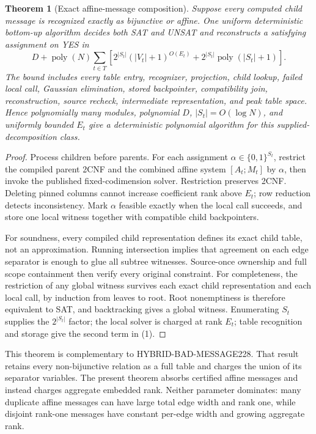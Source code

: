 \documentclass[11pt]{article}
\newtheorem{theorem}{Theorem}
\begin{document}
\begin{theorem}[Exact affine-message composition]
Suppose every computed child message is recognized exactly as bijunctive or
affine.  One uniform deterministic bottom-up algorithm decides both SAT and
UNSAT and reconstructs a satisfying assignment on YES in
\[
 D+\operatorname{poly}(N)\sum_{t\in T}
 \left[2^{|S_t|}(|V_t|+1)^{O(E_t)}
       +2^{|S_t|}\operatorname{poly}(|S_t|+1)\right]. \tag{1}
\]
The bound includes every table entry, recognizer, projection, child lookup,
failed local call, Gaussian elimination, stored backpointer, compatibility
join, reconstruction, source recheck, intermediate representation, and peak
table space.  Hence polynomially many modules, polynomial $D$,
$|S_t|=O(\log N)$, and uniformly bounded $E_t$ give a deterministic
polynomial algorithm for this supplied-decomposition class.
\end{theorem}
\begin{proof}
Process children before parents.  For each assignment
$\alpha\in\{0,1\}^{S_t}$, restrict the compiled parent 2CNF and the combined
affine system $[A_t;M_t]$ by $\alpha$, then invoke the published
fixed-codimension solver.  Restriction preserves 2CNF.  Deleting pinned
columns cannot increase coefficient rank above $E_t$; row reduction detects
inconsistency.  Mark $\alpha$ feasible exactly when the local call succeeds,
and store one local witness together with compatible child backpointers.

For soundness, every compiled child representation defines its exact child
table, not an approximation.  Running intersection implies that agreement on
each edge separator is enough to glue all subtree witnesses.  Source-once
ownership and full scope containment then verify every original constraint.
For completeness, the restriction of any global witness survives each exact
child representation and each local call, by induction from leaves to root.
Root nonemptiness is therefore equivalent to SAT, and backtracking gives a
global witness.  Enumerating $S_t$ supplies the $2^{|S_t|}$ factor; the local
solver is charged at rank $E_t$; table recognition and storage give the
second term in (1).
\end{proof}

This theorem is complementary to HYBRID-BAD-MESSAGE228.  That result retains
every non-bijunctive relation as a full table and charges the union of its
separator variables.  The present theorem absorbs certified affine messages
and instead charges aggregate embedded rank.  Neither parameter dominates:
many duplicate affine messages can have large total edge width and rank one,
while disjoint rank-one messages have constant per-edge width and growing
aggregate rank.
\end{document}
